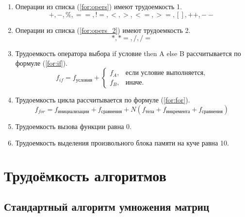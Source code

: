 \begin{enumerate}
	\item Операции из списка (\ref{for:opers}) имеют трудоемкость 1.
	\begin{equation}
	\label{for:opers}
	+, -, \%, ==, !=, <, >, <=, >=, [], ++, {-}-
	\end{equation}
	\item Операции из списка (\ref{for:opers_2}) имеют трудоемкость 2.
	\begin{equation}
	\label{for:opers_2}
	*, *=, /, /=
	\end{equation}
	\item Трудоемкость оператора выбора if условие then A else B рассчитывается по формуле (\ref{for:if}).
	\begin{equation}
	\label{for:if}
	f_{if} = f_{\text{условия}} +
	\begin{cases}
	f_A, & \text{если условие выполняется,}\\
	f_B, & \text{иначе.}
	\end{cases}
	\end{equation}
	\item Трудоемкость цикла рассчитывается по формуле (\ref{for:for}).
	\begin{equation}
	\label{for:for}
	f_{for} = f_{\text{инициализации}} + f_{\text{сравнения}} + N(f_{\text{тела}} + f_{\text{инкремента}} + f_{\text{сравнения}})
	\end{equation}
	\item Трудоемкость вызова функции равна 0.
	\item Трудоемкость выделения произвольного блока памяти на куче равна 10.
\end{enumerate}

\section{Трудоёмкость алгоритмов}

\subsection{Стандартный алгоритм умножения матриц}

